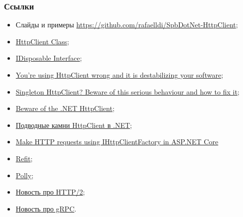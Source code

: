 \documentclass{beamer}
\begin{document}
\begin{frame}
\frametitle{Ссылки}
\begin{itemize}
	\item Слайды и примеры \href{https://github.com/rafaelldi/SpbDotNet-HttpClient}{https://github.com/rafaelldi/SpbDotNet-HttpClient};
	\item \href{https://docs.microsoft.com/en-us/dotnet/api/system.net.http.httpclient?view=netcore-2.2}{HttpClient Class};
	\item \href{https://docs.microsoft.com/en-us/dotnet/api/system.idisposable?view=netcore-2.2}{IDisposable Interface};
	\item \href{https://aspnetmonsters.com/2016/08/2016-08-27-httpclientwrong/}{You're using HttpClient wrong and it is destabilizing your software};
	\item \href{https://byterot.blogspot.com/2016/07/singleton-httpclient-dns.html}{Singleton HttpClient? Beware of this serious behaviour and how to fix it};
	\item \href{https://nima-ara-blog.azurewebsites.net/beware-of-the-net-httpclient/}{Beware of the .NET HttpClient};
	\item \href{https://habr.com/en/post/424873/}{Подводные камни HttpClient в .NET};
	\item \href{https://docs.microsoft.com/en-us/aspnet/core/fundamentals/http-requests?view=aspnetcore-2.2}{Make HTTP requests using IHttpClientFactory in ASP.NET Core}
	\item \href{https://github.com/reactiveui/refit}{Refit};
	\item \href{https://github.com/App-vNext/Polly}{Polly};
	\item \href{https://devblogs.microsoft.com/dotnet/announcing-net-core-3-0-preview-6/}{Новость про HTTP/2};
	\item \href{https://devblogs.microsoft.com/aspnet/asp-net-core-and-blazor-updates-in-net-core-3-0-preview-6/}{Новость про gRPC}.
\end{itemize}
\end{frame}
\end{document}

